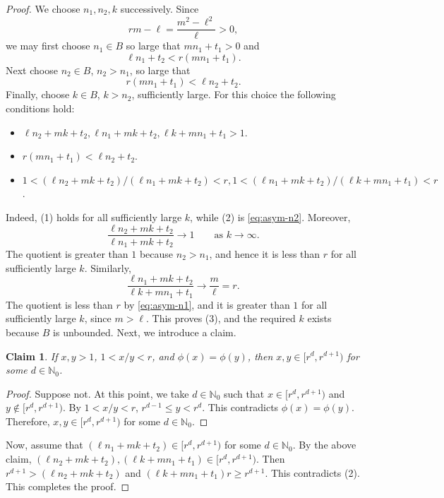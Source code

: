 \documentclass[10pt,a4paper]{amsart}
\newtheorem{cl}{Claim}
\newcommand{\Nzero}{\mathbb N_0}
\begin{document}
\begin{proof}
We choose $n_1,n_2,k$ successively. Since
\[
 rm-\ell=\frac{m^2-\ell^2}{\ell}>0,
\]
we may first choose $n_1\in B$ so large that $mn_1+t_1>0$ and
\begin{equation}\label{eq:asym-n1}
 \ell n_1+t_2<r(mn_1+t_1).
\end{equation}
Next choose $n_2\in B$, $n_2>n_1$, so large that
\begin{equation}\label{eq:asym-n2}
 r(mn_1+t_1)<\ell n_2+t_2.
\end{equation}
Finally, choose $k\in B$, $k>n_2$, sufficiently large. For this choice
the following conditions hold:
\begin{itemize}
\item[(1)] $\ell n_2+mk+t_2,\ell n_1+mk+t_2,\ell k+mn_1+t_1>1$.
\item[(2)] $r(mn_{1}+t_1)<\ell n_2+t_2$.
\item[(3)] $1<(\ell n_2+mk+t_2)/(\ell n_1+mk+t_2)<r,1<(\ell n_1+mk+t_2)/(\ell k+mn_1+t_1)<r$.
\end{itemize}
Indeed, (1) holds for all sufficiently large $k$, while (2) is
\eqref{eq:asym-n2}. Moreover,
\[
 \frac{\ell n_2+mk+t_2}{\ell n_1+mk+t_2}\longrightarrow1
 \qquad\text{as }k\to\infty.
\]
The quotient is greater than $1$ because $n_2>n_1$, and hence it is
less than $r$ for all sufficiently large $k$. Similarly,
\[
 \frac{\ell n_1+mk+t_2}{\ell k+mn_1+t_1}\longrightarrow
 \frac m\ell=r.
\]
The quotient is less than $r$ by \eqref{eq:asym-n1}, and it is greater
than $1$ for all sufficiently large $k$, since $m>\ell$. This proves
(3), and the required $k$ exists because $B$ is unbounded.
Next, we introduce a claim.
\begin{cl}
	If $x,y>1$, $1<x/y<r$, and $\phi(x)=\phi(y)$, then $x,y\in [r^d,r^{d+1})$ for some $d\in \Nzero$.
\end{cl}
\begin{proof}
	Suppose not. At this point, we take $d\in \Nzero$ such that $x\in [r^d,r^{d+1})$ and $y\notin [r^d,r^{d+1})$. By $1<x/y<r$, $r^{d-1}\le y<r^{d}$. This contradicts $\phi(x)=\phi(y)$. Therefore, $x,y\in [r^d,r^{d+1})$ for some $d\in \Nzero$.
\end{proof}
Now, assume that $(\ell n_1+mk+t_2)\in [r^d,r^{d+1})$ for some $d\in \Nzero$. By the above claim, $(\ell n_2+mk+t_2),(\ell k+mn_1+t_1)\in [r^d,r^{d+1})$. Then $r^{d+1}>(\ell n_2+mk+t_2)$ and $(\ell k+mn_1+t_1)r\ge r^{d+1}$. This contradicts (2). This completes the proof.

\end{proof}
\end{document}
